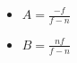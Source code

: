 \documentclass[12pt]{article}
\begin{document}
    \begin{itemize}
        \item \(A=\frac{-f}{f-n}\)
        \item \(B=\frac{nf}{f-n}\)
    \end{itemize}
\end{document}
